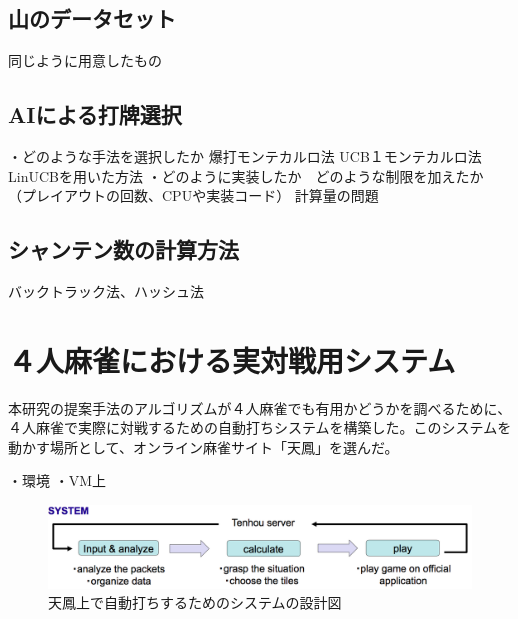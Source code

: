 \subsection{山のデータセット}
同じように用意したもの

\subsection{AIによる打牌選択}
・どのような手法を選択したか
爆打モンテカルロ法
UCB１モンテカルロ法
LinUCBを用いた方法
・どのように実装したか　どのような制限を加えたか
（プレイアウトの回数、CPUや実装コード）
計算量の問題

\subsection{シャンテン数の計算方法}
バックトラック法、ハッシュ法






\section{４人麻雀における実対戦用システム} %
本研究の提案手法のアルゴリズムが４人麻雀でも有用かどうかを調べるために、４人麻雀で実際に対戦するための自動打ちシステムを構築した。このシステムを動かす場所として、オンライン麻雀サイト「天鳳」を選んだ。

・環境
・VM上

\begin{figure}[h]
 \centering
 \includegraphics[keepaspectratio, scale=0.3,bb=0 0 1226 243]
      {img/imp1.png}
 \caption{天鳳上で自動打ちするためのシステムの設計図}
\end{figure}


